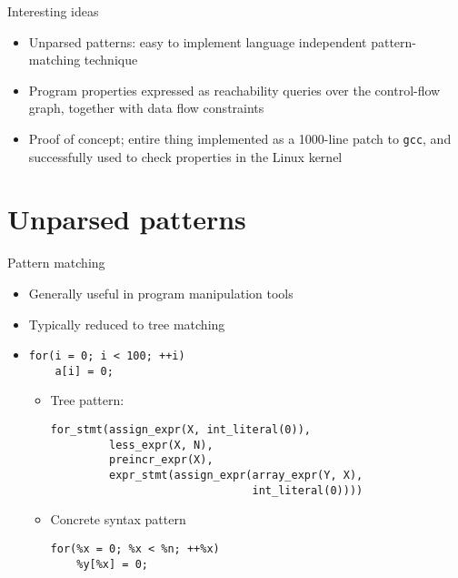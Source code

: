 \documentclass{beamer}
\begin{document}
\begin{frame}{Interesting ideas}
\begin{itemize}
\item Unparsed patterns: easy to implement language independent 
pattern-matching technique
\item Program properties expressed as reachability queries over the
control-flow graph, together with data flow constraints
\item Proof of concept; entire thing implemented as a 1000-line patch
to {\tt gcc}, and successfully used to check properties in the Linux kernel
\end{itemize}
\end{frame}

\section{Unparsed patterns}
\begin{frame}[fragile]{Pattern matching}
\begin{itemize}
\item Generally useful in program manipulation tools
\item Typically reduced to tree matching
\item \begin{verbatim}
for(i = 0; i < 100; ++i)
    a[i] = 0;
\end{verbatim}
\begin{itemize}
\item Tree pattern:
\begin{verbatim}
for_stmt(assign_expr(X, int_literal(0)),
         less_expr(X, N),
         preincr_expr(X),
         expr_stmt(assign_expr(array_expr(Y, X), 
                               int_literal(0))))
\end{verbatim}
\item Concrete syntax pattern
\begin{verbatim}
for(%x = 0; %x < %n; ++%x)
    %y[%x] = 0;
\end{verbatim}
\end{itemize}
\end{itemize}
\end{frame}
\end{document}
